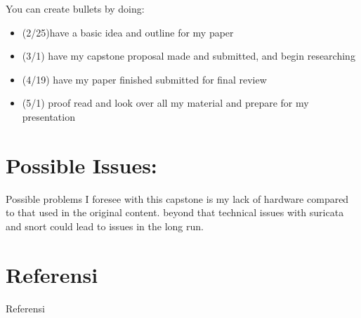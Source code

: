 \documentclass{article}
\begin{document}
\begin{normalsize}
        \noindent You can create bullets by doing:
        
        \begin{itemize}
            \item(2/25)have a basic idea and outline for my paper
            \item (3/1) have my capstone proposal made and submitted, and begin researching
            \item(4/19) have my paper finished submitted for final review
            \item(5/1) proof read and look over all my material and prepare for my presentation
        \end{itemize}
        
    	\section{Possible Issues:}
        Possible problems I foresee with this capstone is my lack of hardware compared to that used in the original content. beyond that technical issues with suricata and snort could lead to issues in the long run.

        \section{Referensi}

        Referensi
    \end{normalsize}
  
\end{document}
